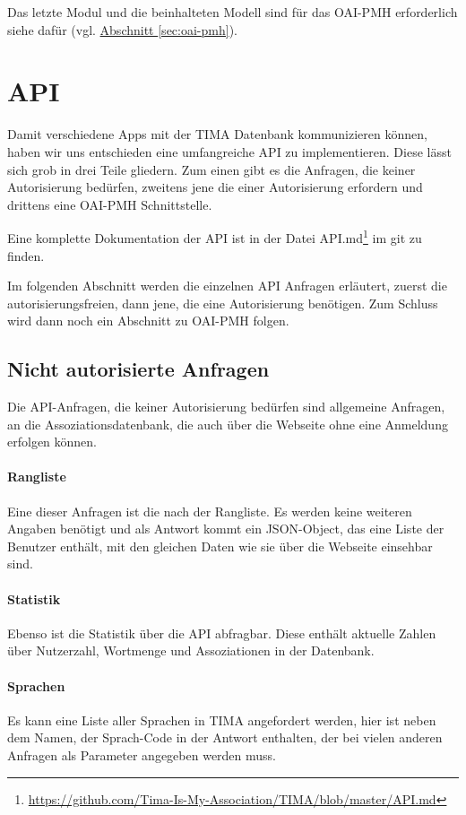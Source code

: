 Das letzte Modul und die beinhalteten Modell sind für das OAI-PMH erforderlich siehe dafür (vgl. \hyperref[sec:oai-pmh]{Abschnitt \ref*{sec:oai-pmh}}).


\section{API}\label{sec:api}
Damit verschiedene Apps mit der TIMA Datenbank kommunizieren können, haben
wir uns entschieden eine umfangreiche API zu implementieren. Diese lässt sich
grob in drei Teile gliedern. Zum einen gibt es die Anfragen, die keiner
Autorisierung bedürfen, zweitens jene die einer Autorisierung erfordern und
drittens eine OAI-PMH Schnittstelle.

Eine komplette Dokumentation der API ist in der Datei API.md\footnote{\url{https://github.com/Tima-Is-My-Association/TIMA/blob/master/API.md}} im git zu finden.

Im folgenden Abschnitt werden die einzelnen API Anfragen erläutert, zuerst die autorisierungsfreien, dann jene, die eine Autorisierung benötigen. Zum Schluss wird dann noch ein Abschnitt zu OAI-PMH folgen.

\subsection{Nicht autorisierte Anfragen}
Die API-Anfragen, die keiner Autorisierung bedürfen sind allgemeine Anfragen, an die Assoziationsdatenbank, die auch über die Webseite ohne eine Anmeldung erfolgen können.

\paragraph{Rangliste} Eine dieser Anfragen ist die nach der Rangliste. Es werden keine weiteren Angaben benötigt und als Antwort kommt ein JSON-Object, das eine Liste der Benutzer enthält, mit den gleichen Daten wie sie über die Webseite einsehbar sind.

\paragraph{Statistik} Ebenso ist die Statistik über die API abfragbar. Diese enthält aktuelle Zahlen über Nutzerzahl, Wortmenge und Assoziationen in der Datenbank.

\paragraph{Sprachen} Es kann eine Liste aller Sprachen in TIMA angefordert werden, hier ist neben dem Namen, der Sprach-Code in der Antwort enthalten, der bei vielen anderen Anfragen als Parameter angegeben werden muss.


